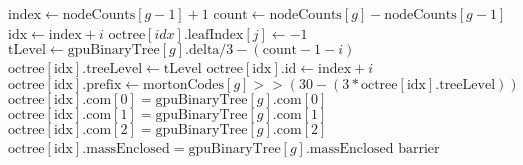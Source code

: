\documentclass{thesis}
\begin{document}
\begin{algorithmic}
            \State $\text{index} \gets \text{nodeCounts}[g - 1] + 1$
            \State $\text{count} \gets \text{nodeCounts}[g] - \text{nodeCounts}[g-1]$
                    \State $\text{idx} \gets \text{index} + i$
                        \State $\text{octree}[idx].\text{leafIndex}[j] \gets -1$    
                    \EndFor
                    \State $\text{tLevel} \gets \text{gpuBinaryTree}[g].\text{delta}/3 - (\text{count} - 1 - i)$
                    \State $\text{octree}[\text{idx}].\text{treeLevel} \gets \text{tLevel}$
                    \State $\text{octree}[\text{idx}].\text{id} \gets \text{index} + i$
                    \State $\text{octree}[\text{idx}].\text{prefix} \gets \text{mortonCodes}[g] >> (30 - (3 * \text{octree}[\text{idx}].\text{treeLevel}))$
                    $\text{octree}[\text{idx}].\text{com}[0] = \text{gpuBinaryTree}[g].\text{com}[0]$
                    $\text{octree}[\text{idx}].\text{com}[1] = \text{gpuBinaryTree}[g].\text{com}[1]$
                    $\text{octree}[\text{idx}].\text{com}[2] = \text{gpuBinaryTree}[g].\text{com}[2]$
                    $\text{octree}[\text{idx}].\text{massEnclosed} = \text{gpuBinaryTree}[g].\text{massEnclosed}$
                \EndFor
            \EndIf
            \State $\text{barrier}$
        \Else
    

\end{algorithmic}
\end{document}

